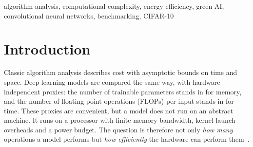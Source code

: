 \documentclass[conference]{IEEEtran}
\begin{document}
\begin{abstract}
Deep learning models are usually compared by accuracy and by hardware-independent cost proxies such as parameter count and floating-point operations (FLOPs). We test how well these proxies predict the real cost of training and inference. Five image classifiers of increasing complexity (an MLP, two plain CNNs, MobileNetV2 and ResNet-18) are trained on CIFAR-10 with one shared recipe on a single consumer laptop GPU (RTX~4060). We vary the training-set size (10--100\%) and repeat every configuration with five seeds, giving 100 runs. Each run records accuracy, macro precision, recall and F1, training and inference time, peak RAM and VRAM, and GPU energy from the hardware counter, cross-checked with power sampling and CodeCarbon. Training time and energy grow linearly with data size (fitted exponent $0.96$--$1.01$, $R^2\geq0.99$) while GPU memory stays constant, as the theory predicts. Across architectures, however, FLOPs are a poor predictor. MobileNetV2 needs $6.3\times$ fewer FLOPs than ResNet-18 yet trains $1.4\times$ slower, uses $1.47\times$ more energy and $2.6\times$ more training VRAM. It sustains only 1.3 vs.\ 11.5~TFLOP/s on the GPU. A medium-sized CNN reaches 89.4\% accuracy with $7.8\times$ less energy than ResNet-18 (92.9\%) and dominates the accuracy--energy Pareto front. Hardware utilisation, not operation count, drives the measured cost.
\end{abstract}

\begin{IEEEkeywords}
algorithm analysis, computational complexity, energy efficiency, green AI, convolutional neural networks, benchmarking, CIFAR-10
\end{IEEEkeywords}

\section{Introduction}
Classic algorithm analysis describes cost with asymptotic bounds on time and space. Deep learning models are compared the same way, with hardware-independent proxies: the number of trainable parameters stands in for memory, and the number of floating-point operations (FLOPs) per input stands in for time. These proxies are convenient, but a model does not run on an abstract machine. It runs on a processor with finite memory bandwidth, kernel-launch overheads and a power budget. The question is therefore not only \emph{how many} operations a model performs but \emph{how efficiently} the hardware can perform them~\cite{williams2009roofline,sze2017efficient}.
\end{document}
